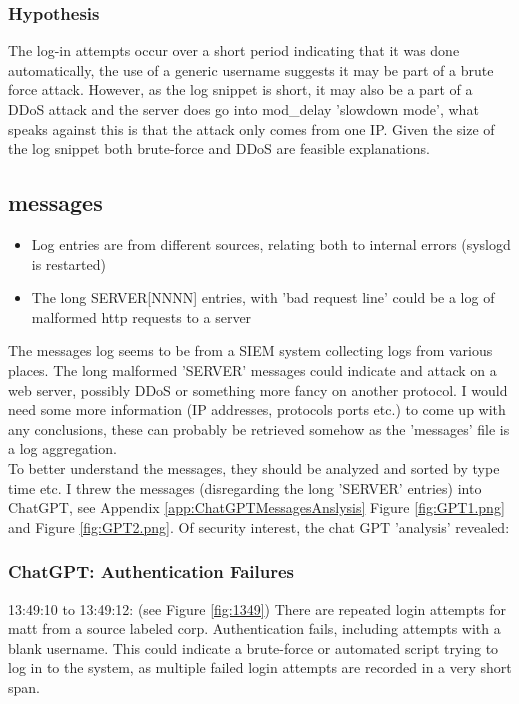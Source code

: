 \documentclass[
	letterpaper, %
	10pt, %
	unnumberedsections, %
	twoside, %
]{APAAssignment}
\begin{document}
\subsubsection{Hypothesis}
The log-in attempts occur over a short period indicating that it was done automatically, the use of a generic username suggests it may be part of a brute force attack. However, as the log snippet is short, it may also be a part of a DDoS attack and the server does go into mod\_delay 'slowdown mode', what speaks against this is that the attack only comes from one IP. Given the size of the log snippet both brute-force and DDoS are feasible explanations.

\subsection{messages}
\begin{itemize}
	\item Log entries are from different sources, relating both to internal errors (syslogd is restarted)
	\item The long SERVER[NNNN] entries, with 'bad request line' could be a log of malformed http requests to a server
\end{itemize}


The messages log seems to be from a SIEM system collecting logs from various places.
The long malformed 'SERVER' messages could indicate and attack on a web server, possibly DDoS or something more fancy on another protocol. I would need some more information (IP addresses, protocols ports etc.) to come up with any conclusions, these can probably be retrieved somehow as the 'messages' file is a log aggregation. \\
To better understand the messages, they should be analyzed and sorted by type time etc. I threw the messages (disregarding the long 'SERVER' entries) into ChatGPT, see Appendix \ref{app:ChatGPTMessagesAnslysis} Figure \ref{fig:GPT1.png} and Figure \ref{fig:GPT2.png}. Of security interest, the chat GPT 'analysis' revealed:

\subsubsection{ChatGPT: Authentication Failures} 13:49:10 to 13:49:12: (see Figure \ref{fig:1349}) There are repeated login attempts for matt from a source labeled corp. Authentication fails,  including attempts with a blank username. This could indicate a brute-force or automated script trying to log in to the system, as multiple failed login attempts are recorded in a very short span. \\
\end{document}
